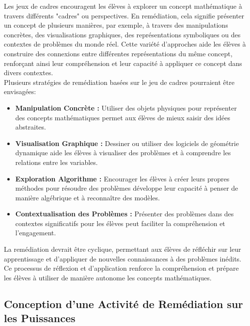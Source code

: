 Les jeux de cadres encouragent les élèves à explorer un concept mathématique à travers différents "cadres" ou perspectives.
En remédiation,
cela signifie présenter un concept de plusieurs manières,
par exemple,
à travers des manipulations concrètes,
des visualisations graphiques,
des représentations symboliques ou des contextes de problèmes du monde réel.
Cette variété d'approches aide les élèves à construire des connexions entre différentes représentations du même concept,
renforçant ainsi leur compréhension et leur capacité à appliquer ce concept dans divers contextes.\\

Plusieurs stratégies de remédiation basées sur le jeu de cadres pourraient être envisagées:
\begin{itemize}%
    \item \textbf{Manipulation Concrète :}
    Utiliser des objets physiques pour représenter des concepts mathématiques permet aux élèves de mieux saisir des idées abstraites.

    \item \textbf{Visualisation Graphique :}
    Dessiner ou utiliser des logiciels de géométrie dynamique aide les élèves à visualiser des problèmes et à comprendre les relations entre les variables.
    
    \item \textbf{Exploration Algorithme :}
    Encourager les élèves à créer leurs propres méthodes pour résoudre des problèmes développe leur capacité à penser de manière algébrique et à reconnaître des modèles.
    
    \item \textbf{Contextualisation des Problèmes :}
    Présenter des problèmes dans des contextes significatifs pour les élèves peut faciliter la compréhension et l'engagement.
\end{itemize}%

La remédiation devrait être cyclique,
permettant aux élèves de réfléchir sur leur apprentissage et d'appliquer de nouvelles connaissances à des problèmes inédits.
Ce processus de réflexion et d'application renforce la compréhension et prépare les élèves à utiliser de manière autonome les concepts mathématiques.

\subsection{Conception d'une Activité de Remédiation sur les Puissances}

